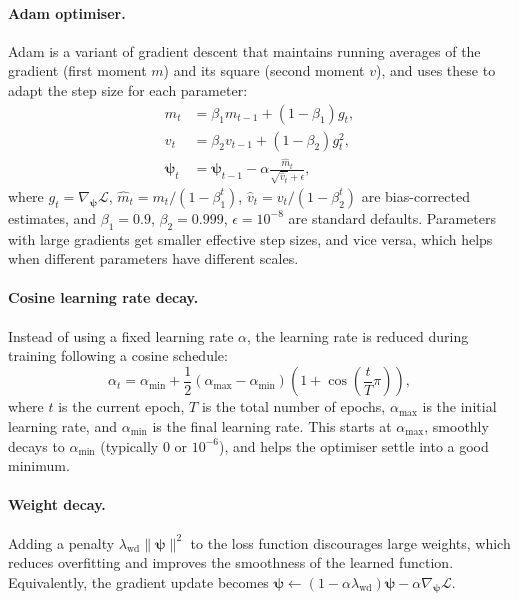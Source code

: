 \documentclass[11pt,a4paper]{article}
\theoremstyle{definition}
\newcommand{\bpsi}{\boldsymbol{\psi}}
\begin{document}
	\paragraph{Adam optimiser.}
	Adam \citep{kingma2015adam} is a variant of gradient descent that maintains running averages of the gradient (first moment $m$) and its square (second moment $v$), and uses these to adapt the step size for each parameter:
	\begin{align}
		m_t &= \beta_1 m_{t-1} + (1-\beta_1) g_t, \\
		v_t &= \beta_2 v_{t-1} + (1-\beta_2) g_t^2, \\
		\bpsi_t &= \bpsi_{t-1} - \alpha \frac{\hat{m}_t}{\sqrt{\hat{v}_t} + \epsilon},
	\end{align}
	where $g_t = \nabla_{\bpsi}\mathcal{L}$, $\hat{m}_t = m_t/(1-\beta_1^t)$, $\hat{v}_t = v_t/(1-\beta_2^t)$ are bias-corrected estimates, and $\beta_1 = 0.9$, $\beta_2 = 0.999$, $\epsilon = 10^{-8}$ are standard defaults.
	Parameters with large gradients get smaller effective step sizes, and vice versa, which helps when different parameters have different scales.
	
	\paragraph{Cosine learning rate decay.}
	Instead of using a fixed learning rate $\alpha$, the learning rate is reduced during training following a cosine schedule:
	\begin{equation}
		\alpha_t = \alpha_{\min} + \frac{1}{2}(\alpha_{\max} - \alpha_{\min})\left(1 + \cos\left(\frac{t}{T}\pi\right)\right),
	\end{equation}
	where $t$ is the current epoch, $T$ is the total number of epochs, $\alpha_{\max}$ is the initial learning rate, and $\alpha_{\min}$ is the final learning rate.
	This starts at $\alpha_{\max}$, smoothly decays to $\alpha_{\min}$ (typically 0 or $10^{-6}$), and helps the optimiser settle into a good minimum.
	
	\paragraph{Weight decay.}
	Adding a penalty $\lambda_{\mathrm{wd}} \|\bpsi\|^2$ to the loss function discourages large weights, which reduces overfitting and improves the smoothness of the learned function.
	Equivalently, the gradient update becomes $\bpsi \leftarrow (1 - \alpha\lambda_{\mathrm{wd}})\bpsi - \alpha \nabla_{\bpsi}\mathcal{L}$.
	
\end{document}
